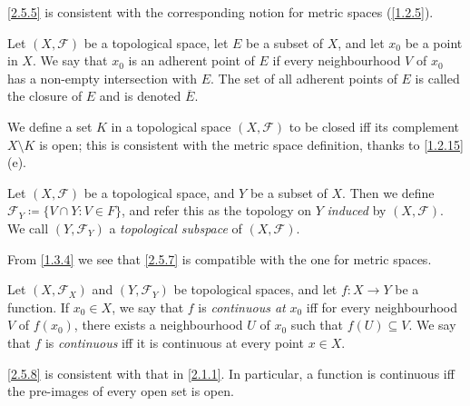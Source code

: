 \begin{note}
  \cref{2.5.5} is consistent with the corresponding notion for metric spaces (\cref{1.2.5}).
\end{note}

\begin{defn}[Closure]\label{2.5.6}
  Let \((X, \mathcal{F})\) be a topological space, let \(E\) be a subset of \(X\), and let \(x_0\) be a point in \(X\).
  We say that \(x_0\) is an adherent point of \(E\) if every neighbourhood \(V\) of \(x_0\) has a non-empty intersection with \(E\).
  The set of all adherent points of \(E\) is called the closure of \(E\) and is denoted \(\overline{E}\).
\end{defn}

\begin{note}
  We define a set \(K\) in a topological space \((X, \mathcal{F})\) to be closed iff its complement \(X \setminus K\) is open;
  this is consistent with the metric space definition, thanks to \cref{1.2.15}(e).
\end{note}

\begin{defn}\label{2.5.7}
  Let \((X, \mathcal{F})\) be a topological space, and \(Y\) be a subset of \(X\).
  Then we define \(\mathcal{F}_Y \coloneqq \{V \cap Y : V \in F\}\), and refer this as the topology on \(Y\) \emph{induced} by \((X, \mathcal{F})\).
  We call \((Y, \mathcal{F}_Y)\) a \emph{topological subspace} of \((X, \mathcal{F})\).
\end{defn}

\begin{note}
  From \cref{1.3.4} we see that \cref{2.5.7} is compatible with the one for metric spaces.
\end{note}

\begin{defn}\label{2.5.8}
  Let \((X, \mathcal{F}_X)\) and \((Y, \mathcal{F}_Y)\) be topological spaces, and let \(f : X \to Y\) be a function.
  If \(x_0 \in X\), we say that \(f\) is \emph{continuous at} \(x_0\) iff for every neighbourhood \(V\) of \(f(x_0)\), there exists a neighbourhood \(U\) of \(x_0\) such that \(f(U) \subseteq V\).
  We say that \(f\) is \emph{continuous} iff it is continuous at every point \(x \in X\).
\end{defn}

\begin{note}
  \cref{2.5.8} is consistent with that in \cref{2.1.1}.
  In particular, a function is continuous iff the pre-images of every open set is open.
\end{note}

